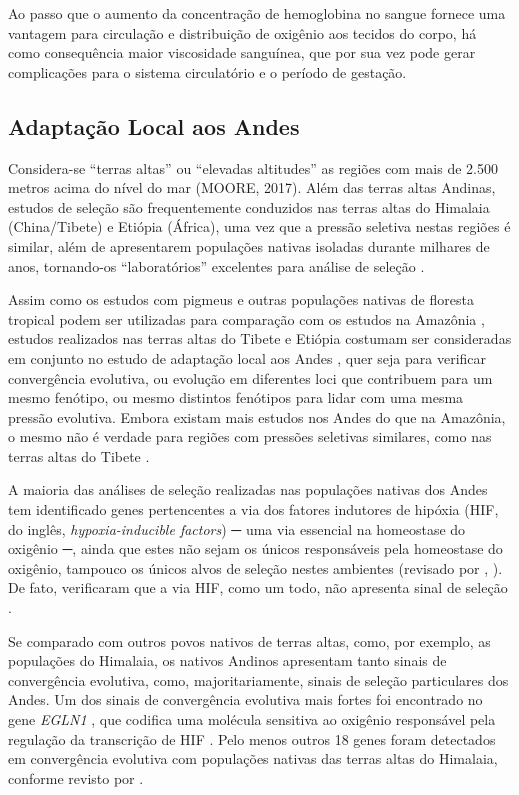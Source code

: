 Ao passo que o aumento da concentração de hemoglobina no sangue fornece uma vantagem para circulação e distribuição de oxigênio aos tecidos do corpo, há como consequência maior viscosidade sanguínea, que por sua vez pode gerar complicações para o sistema circulatório e o período de gestação.

\subsection{Adaptação Local aos Andes}

Considera-se “terras altas” ou “elevadas altitudes” as regiões com mais de 2.500 metros acima do nível do mar (MOORE, 2017). Além das terras altas Andinas, estudos de seleção são frequentemente conduzidos nas terras altas do Himalaia (China/Tibete) e Etiópia (África), uma vez que a pressão seletiva nestas regiões é similar, além de apresentarem populações nativas isoladas durante milhares de anos, tornando-os “laboratórios” excelentes para análise de seleção \cite{fan_going_2016}. 

Assim como os estudos com pigmeus e outras populações nativas de floresta tropical podem ser utilizadas para comparação com os estudos na Amazônia \cite{amorim_detection_2015}, estudos realizados nas terras altas do Tibete e Etiópia costumam ser consideradas em conjunto no estudo de adaptação local aos Andes \cite{bigham_human_2014}, quer seja para verificar convergência evolutiva, ou evolução em diferentes loci que contribuem para um mesmo fenótipo, ou mesmo distintos fenótipos para lidar com uma mesma pressão evolutiva. Embora existam mais estudos nos Andes do que na Amazônia, o mesmo não é verdade para regiões com pressões seletivas similares, como nas terras altas do Tibete \cite{julian_human_2019}.

A maioria das análises de seleção realizadas nas populações nativas dos Andes tem identificado genes pertencentes a via dos fatores indutores de hipóxia (HIF, do inglês, \textit{hypoxia-inducible factors}) ─ uma via essencial na homeostase do oxigênio ─, ainda que estes não sejam os únicos responsáveis pela homeostase do oxigênio,  tampouco os únicos alvos de seleção nestes ambientes (revisado por \citeauthor{julian_human_2019}, \citeyear{julian_human_2019}). De fato,  verificaram que a via HIF, como um todo, não apresenta sinal de seleção \cite{bigham_identifying_2009}.

Se comparado com outros povos nativos de terras altas, como, por exemplo, as populações do Himalaia, os nativos Andinos apresentam tanto sinais de convergência evolutiva, como, majoritariamente, sinais de seleção particulares dos Andes. Um dos sinais de convergência evolutiva mais fortes foi encontrado no gene \textsl{EGLN1} \cite{bigham_identifying_2010}, que codifica uma molécula sensitiva ao oxigênio responsável pela regulação da transcrição de HIF \cite{to_suppression_2005}. Pelo menos outros 18 genes foram detectados em convergência evolutiva com populações nativas das terras altas do Himalaia, conforme revisto por .

